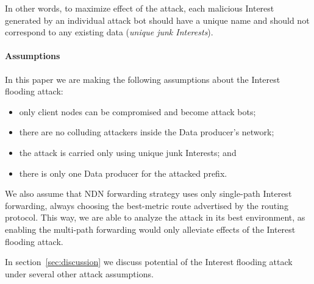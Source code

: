 In other words, to maximize effect of the attack, each malicious Interest generated by an individual attack bot should have a unique name and should not correspond to any existing data (\emph{unique junk Interests}).

\paragraph{Assumptions} 


In this paper we are making the following assumptions about the Interest flooding attack:
\begin{itemize}
\item only client nodes can be compromised and become attack bots;
\item there are no colluding attackers inside the Data producer's network;
\item the attack is carried only using unique junk Interests; and
\item there is only one Data producer for the attacked prefix.
\end{itemize}

We also assume that NDN forwarding strategy uses only single-path Interest forwarding, always choosing the best-metric route advertised by the routing protocol.
This way, we are able to analyze the attack in its best environment, as enabling the multi-path forwarding would only alleviate effects of the Interest flooding attack.

In section~\ref{sec:discussion} we discuss potential of the Interest flooding attack under several other attack assumptions.

